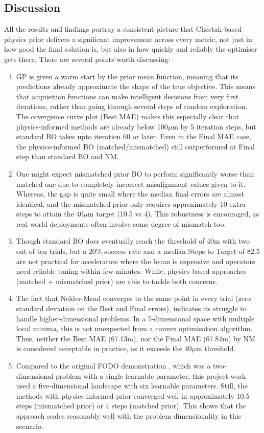 \subsection{Discussion}
All the results and findings portray a consistent picture that Cheetah-based physics prior delivers a significant improvement 
across every metric, not just in how good the final solution is, but also in how quickly and reliably the optimiser gets there. 
There are several points worth discussing:
\begin{enumerate}
    \item GP is given a warm start by the prior mean function, meaning that its predictions already approximate the shape of the true objective. This means that acquisition functions can make intelligent decisions from very first iterations, rather than going through several steps of  random exploration. The covergence curve plot (Best MAE) makes this especially clear that physics-informed methods are already below 100$\mu$m by 5 iteration steps, but standard BO takes upto iteration 60 or later. Even in the Final MAE case, the physics-informed BO (matched/mismatched) still outperformed at Final step than standard BO and NM. 
    \item One might expect mismatched prior BO to perform significantly worse than matched one due to completely incorrect misalignment values given to it. Whereas, the gap is quite small where the median final errors are almost identical, and the mismatched prior only requires approximately 10 extra steps to attain the 40$\mu$m target (10.5 vs 4). This robustness is encouraged, as real world deployments often involve some degree of mismatch too.
    \item Though standard BO does eventually reach the threshold of \SI{40}{\mu}m with two out of ten trials, but a 20\% success rate and a median Steps to Target of 82.5 are not practical for accelerators where the beam is expensive and operators need reliable tuning within few minutes. While, physics-based approaches (matched + mismatched prior) are able to tackle both concerns.
    \item The fact that Nelder-Mead converges to the same point in every trial (zero standard deviation on the Best and Final errors), indicates its struggle to handle higher-dimensional problems. In a 5-dimensional space with multiple local minima, this is not unexpected from a convex optimisation algorithm. Thus, neither the Best MAE (\SI{67.13}{\mu}m), nor the Final MAE (\SI{67.84}{\mu}m) by NM is considered acceptable in practice, as it exceeds the 40$\mu$m threshold.
    \item Compared to the original FODO demonstration \cite{kaiser2024bridging}, which was a two-dimensional problem with a single learnable parameter, this project work used a five-dimensional landscape with six learnable parameters. Still, the methods with physics-informed prior converged well in approximately 10.5 steps (mismatched prior) or 4 steps (matched prior). This shows that the approach scales reasonably well with the problem dimensionality in this scenario. 
\end{enumerate}


